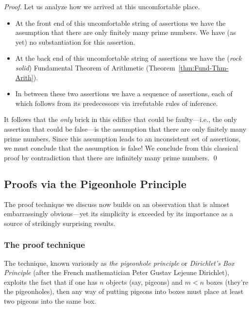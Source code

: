 \begin{proof}
\medskip

Let us analyze how we arrived at this uncomfortable place.
\begin{itemize}
\item
At the front end of this uncomfortable string of assertions we have the assumption that there are only finitely many prime numbers.  We have (as yet) no substantiation for this assertion.
\medskip\item
At the back end of this uncomfortable string of assertions we have the ({\em rock solid}) Fundamental Theorem of Arithmetic (Theorem~\ref{thm:Fund-Thm-Arith}).
\medskip\item
In between these two assertions we have a sequence of assertions, each of which follows from its predecessors via irrefutable rules of inference.
\end{itemize}
It follows that the {\em only} brick in this edifice that could be faulty---i.e., the only assertion that could be false---is the assumption that there are only finitely many prime numbers.  Since this assumption leads to an inconsistent set of assertions, we must conclude that the assumption is false!  We conclude from this classical proof by contradiction that there are infinitely many prime
numbers.  \qed
\end{proof}


\subsection{Proofs via the Pigeonhole Principle}
\label{sec:pigeonhole}

The proof technique we discuss now builds on an observation that is almost embarrassingly obvious---yet its simplicity is exceeded by its importance as a source of strikingly surprising results.

\subsubsection{The proof technique}

 

The technique, known variously as {\it the pigeonhole principle} or {\it Dirichlet's Box Principle}
(after the French mathematician Peter Gustav Lejeune Dirichlet), exploits the fact that if one has $n$ objects (say, pigeons) and $m < n$ boxes (they're the pigeonholes), then any way of putting pigeons into boxes must place at least two pigeons into the same box.


